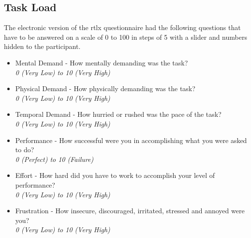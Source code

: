 \subsection{Task Load}
The electronic version of the \acrfull{rtlx} questionnaire had the following questions that have to be answered on a scale of 0 to 100 in steps of 5 with a slider and numbers hidden to the participant. 
\begin{itemize}
	\item Mental Demand - How mentally demanding was the task?\\
	\textit{0 (Very Low) to 10 (Very High)}
	\item Physical Demand - How physically demanding was the task?\\
	\textit{0 (Very Low) to 10 (Very High)}
	\item Temporal Demand - How hurried or rushed was the pace of the task?\\
	\textit{0 (Very Low) to 10 (Very High)}
	\item Performance - How successful were you in accomplishing what you were asked to do?\\
	\textit{0 (Perfect) to 10 (Failure)}
	\item Effort - How hard did you have to work to accomplish your level of performance?\\
	\textit{0 (Very Low) to 10 (Very High)}
	\item Frustration - How insecure, discouraged, irritated, stressed and annoyed were you?\\	
	\textit{0 (Very Low) to 10 (Very High)}
\end{itemize}
